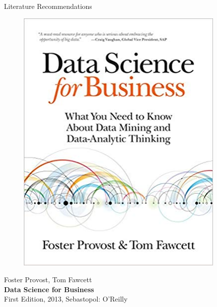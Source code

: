 \documentclass[main.tex]{subfiles}
\begin{document}
    \begin{frame}{Literature Recommendations}
        \begin{minipage}{0.1\textwidth}
            \begin{figure}[H]
                \includegraphics[height=0.2\textheight, width=0.9\textwidth, left]{assets/book-covers/provost2013.jpg}
            \end{figure}
        \end{minipage}
        \begin{minipage}{0.32\textwidth}
            \footnotesize Foster Provost, Tom Fawcett \normalsize \\[-0.5mm]
            \small \textbf{Data Science for Business} \normalsize \\
            \tiny First Edition, 2013, Sebastopol: O'Reilly \normalsize
        \end{minipage}
        \begin{minipage}{0.1\textwidth}
            \begin{figure}[H]

\end{figure}
\end{minipage}
\end{frame}
\end{document}
